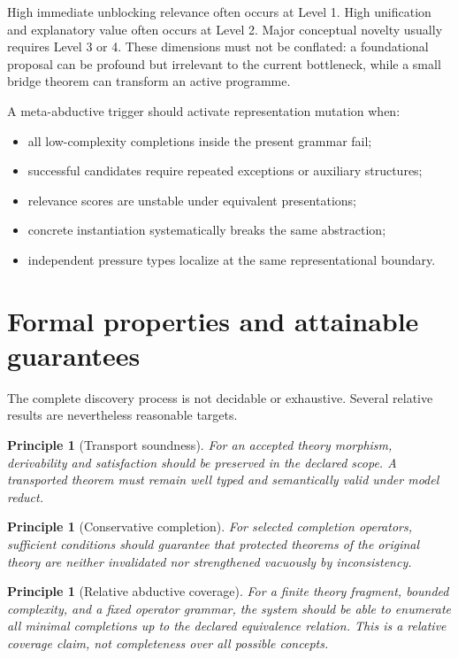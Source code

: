 \documentclass[11pt]{article}
\newtheorem{principle}[definition]{Principle}
\begin{document}
High immediate unblocking relevance often occurs at Level 1. High unification and explanatory value
often occurs at Level 2. Major conceptual novelty usually requires Level 3 or 4. These dimensions must
not be conflated: a foundational proposal can be profound but irrelevant to the current bottleneck,
while a small bridge theorem can transform an active programme.

A meta-abductive trigger should activate representation mutation when:
\begin{itemize}
  \item all low-complexity completions inside the present grammar fail;
  \item successful candidates require repeated exceptions or auxiliary structures;
  \item relevance scores are unstable under equivalent presentations;
  \item concrete instantiation systematically breaks the same abstraction;
  \item independent pressure types localize at the same representational boundary.
\end{itemize}

\section{Formal properties and attainable guarantees}

The complete discovery process is not decidable or exhaustive. Several relative results are nevertheless
reasonable targets.

\begin{principle}[Transport soundness]
For an accepted theory morphism, derivability and satisfaction should be preserved in the declared
scope. A transported theorem must remain well typed and semantically valid under model reduct.
\end{principle}

\begin{principle}[Conservative completion]
For selected completion operators, sufficient conditions should guarantee that protected theorems of
the original theory are neither invalidated nor strengthened vacuously by inconsistency.
\end{principle}

\begin{principle}[Relative abductive coverage]
For a finite theory fragment, bounded complexity, and a fixed operator grammar, the system should be
able to enumerate all minimal completions up to the declared equivalence relation. This is a relative
coverage claim, not completeness over all possible concepts.
\end{principle}
\end{document}
